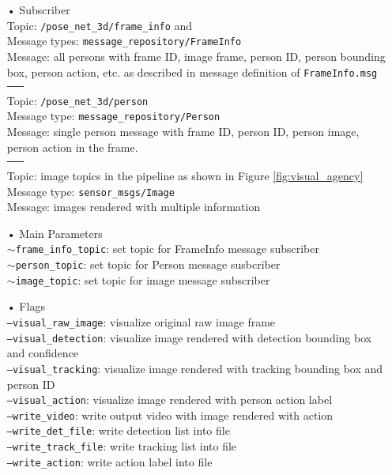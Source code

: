 \begin{itemize}
\item[•] Subscriber \\
Topic: \texttt{/pose\_net\_3d/frame\_info} and  \\
Message types: \texttt{message\_repository/FrameInfo} \\
Message: all persons with frame ID, image frame, person ID, person bounding box, person action, etc. as described in message definition of \texttt{FrameInfo.msg} \\
\texttt{--------} \\
Topic: \texttt{/pose\_net\_3d/person} \\
Message type: \texttt{message\_repository/Person} \\
Message: single person message with frame ID, person ID, person image, person action in the frame. \\
\texttt{--------}\\
Topic: image topics in the pipeline as shown in Figure \ref{fig:visual_agency} \\
Message type: \texttt{sensor\_msgs/Image} \\
Message: images rendered with multiple information

\item[•] Main Parameters \\
\texttt{$\sim$frame\_info\_topic}: set topic for FrameInfo message subscriber \\
\texttt{$\sim$person\_topic}: set topic for Person message susbcriber \\
\texttt{$\sim$image\_topic}: set topic for image message subscriber 

\item[•] Flags \\
\texttt{---visual\_raw\_image}: visualize original raw image frame \\
\texttt{---visual\_detection}: visualize image rendered with detection bounding box and confidence \\
\texttt{---visual\_tracking}: visualize image rendered with tracking bounding box and person ID \\
\texttt{---visual\_action}: visualize image rendered with person action label \\
\texttt{---write\_video}: write output video with image rendered with action \\
\texttt{---write\_det\_file}: write detection list into file \\
\texttt{---write\_track\_file}: write tracking list into file \\
\texttt{---write\_action}: write action label into file
\end{itemize}

